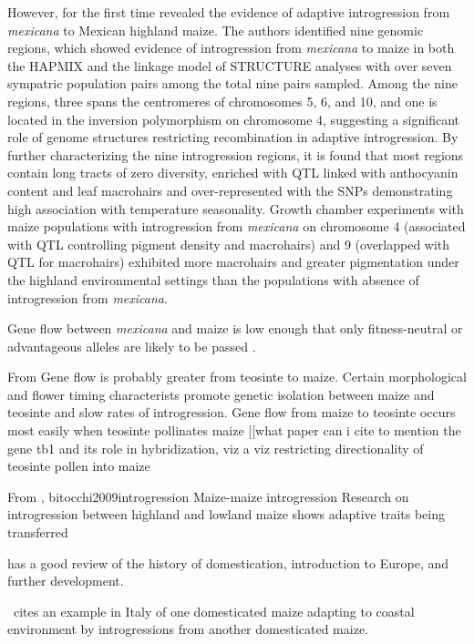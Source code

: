 \documentclass[11pt]{article}
\begin{document}
However, \cite{hufford2013} for the first time revealed the evidence of adaptive introgression from \emph{mexicana} to Mexican highland maize.
The authors identified nine genomic regions, which showed evidence of introgression from \emph{mexicana} to maize in both the HAPMIX and the linkage model of STRUCTURE analyses with over seven sympatric population pairs among the total nine pairs sampled. 
Among the nine regions, three spans the centromeres of chromosomes 5, 6, and 10, and one is located in the inversion polymorphism on chromosome 4, suggesting a significant role of genome structures restricting recombination in adaptive introgression.
By further characterizing the nine introgression regions, it is found that most regions contain long tracts of zero diversity, enriched with QTL linked with anthocyanin content and leaf macrohairs \cite{lauter2004} and over-represented with the SNPs demonstrating high association with temperature seasonality.
Growth chamber experiments with maize populations with introgression from \emph{mexicana} on chromosome 4 (associated with QTL controlling pigment density and macrohairs) and 9 (overlapped with QTL for macrohairs) exhibited more macrohairs and greater pigmentation under the highland environmental settings than the populations with absence of introgression from \emph{mexicana}.

Gene flow between \emph{mexicana} and maize is low enough that only fitness-neutral or advantageous alleles are likely to be passed \cite{slatkin1987gene}.

From \cite{baltazar2005pollination}
Gene flow is probably greater from teosinte to maize.
Certain morphological and flower timing characterists promote genetic isolation between maize and teosinte and slow rates of introgression.
Gene flow from maize to teosinte occurs most easily when teosinte pollinates maize
[[what paper can i cite to mention the gene tb1 and its role in hybridization, viz a viz restricting directionality of teosinte pollen into maize

From \cite{jiang1999genetic}, {bitocchi2009introgression}
Maize-maize introgression
Research on introgression between highland and lowland maize shows adaptive traits being transferred

\cite{bitocchi2009introgression} has a good review of the history of domestication, introduction to Europe, and further development.

\cite{hammer1987collection}\ cites an example in Italy of one domesticated maize adapting to coastal environment by introgressions from another domesticated maize.
\end{document}
